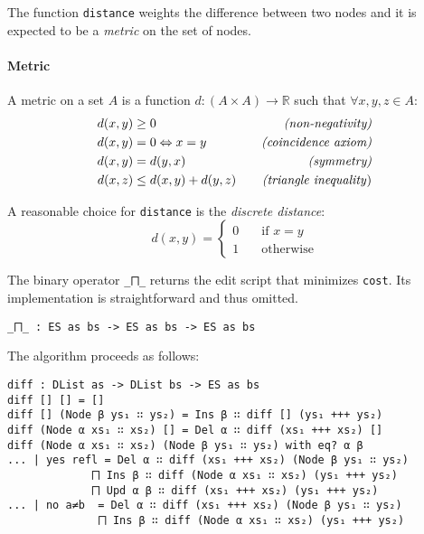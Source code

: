 \documentclass[../Thesis.tex]{subfiles}
\begin{document}
	The function \texttt{distance} weights the difference between two nodes 
	and it is expected to be a \emph{metric} on the set of nodes.

	\paragraph{Metric}
	
	A metric on a set $A$ is a function $d	 : (A \times A) \rightarrow \mathbb{R}$
	such that $\forall x, y, z \in A$:
	\begin{align*}
		d(x, y) &\geq 0 \quad &\mbox{\emph{{(non-negativity)}}}\\ 
		d(x, y) &= 0 \Leftrightarrow x = y \quad &\mbox{\emph{(coincidence axiom)}} \\		
		d(x, y) &= d(y, x) \quad &\mbox{\emph{(symmetry)}}\\
		d(x, z) &\leq d(x, y) + d(y, z) \quad &\mbox{\emph{(triangle inequality})}
	\end{align*}
	
	A reasonable choice for \texttt{distance} is the \emph{discrete distance}:
	\[ d(x, y) = 
		\begin{cases} 
			0 \quad &\mbox{if } x = y \\
			1 \quad &\mbox {otherwise}		
		\end{cases} \]
	
	The binary operator \texttt{\_⨅\_} returns the edit script that minimizes 	
	\texttt{cost}. Its implementation is straightforward and thus omitted.

\begin{verbatim}
_⨅_ : ES as bs -> ES as bs -> ES as bs
\end{verbatim}

	The algorithm proceeds as follows:

\begin{verbatim}
diff : DList as -> DList bs -> ES as bs
diff [] [] = []
diff [] (Node β ys₁ ∷ ys₂) = Ins β ∷ diff [] (ys₁ +++ ys₂)
diff (Node α xs₁ ∷ xs₂) [] = Del α ∷ diff (xs₁ +++ xs₂) []
diff (Node α xs₁ ∷ xs₂) (Node β ys₁ ∷ ys₂) with eq? α β
... | yes refl = Del α ∷ diff (xs₁ +++ xs₂) (Node β ys₁ ∷ ys₂) 
             ⨅ Ins β ∷ diff (Node α xs₁ ∷ xs₂) (ys₁ +++ ys₂) 
             ⨅ Upd α β ∷ diff (xs₁ +++ xs₂) (ys₁ +++ ys₂)
... | no a≠b  = Del α ∷ diff (xs₁ +++ xs₂) (Node β ys₁ ∷ ys₂) 
              ⨅ Ins β ∷ diff (Node α xs₁ ∷ xs₂) (ys₁ +++ ys₂)
\end{verbatim}
	
\end{document}
